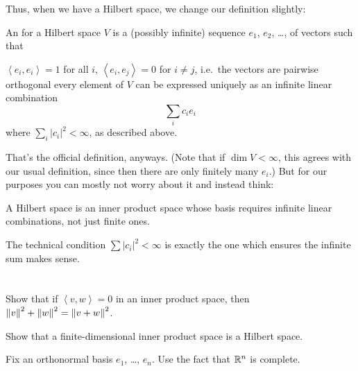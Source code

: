 Thus, when we have a Hilbert space, we change our definition slightly:
\begin{definition}
	An  for a Hilbert space $V$
	is a (possibly infinite) sequence $e_1$, $e_2$, \dots,
	of vectors such that
	\begin{itemize}
		\ii $\left< e_i, e_i \right> = 1$ for all $i$,
		\ii $\left< e_i, e_j \right> = 0$ for $i \neq j$,
		i.e.\ the vectors are pairwise orthogonal
		\ii every element of $V$ can be expressed uniquely as an
		infinite linear combination
		\[ \sum_i c_i e_i \]
		where $\sum_i \left\lvert c_i \right\rvert^2 < \infty$,
		as described above.
	\end{itemize}
\end{definition}
That's the official definition, anyways.
(Note that if $\dim V < \infty$, this agrees with our usual definition,
since then there are only finitely many $e_i$.)
But for our purposes you can mostly not worry about it and instead think:
\begin{moral}
	A Hilbert space is an inner product space
	whose basis requires infinite linear combinations,
	not just finite ones.
\end{moral}
The technical condition $\sum \left\lvert c_i \right\rvert^2 < \infty$
is exactly the one which ensures the infinite sum makes sense.

\section{\problemhead}

\begin{problem}
	Show that if $\left< v,w \right> = 0$ in an inner product space,
	then $\left\lVert v \right\rVert^2 + \left\lVert w \right\rVert^2 = \left\lVert v+w \right\rVert^2$.
\end{problem}

\begin{sproblem}
	Show that a finite-dimensional inner product space
	is a Hilbert space.
	\begin{hint}
		Fix an orthonormal basis $e_1$, \dots, $e_n$.
		Use the fact that $\mathbb R^n$ is complete.
	\end{hint}
\end{sproblem}


